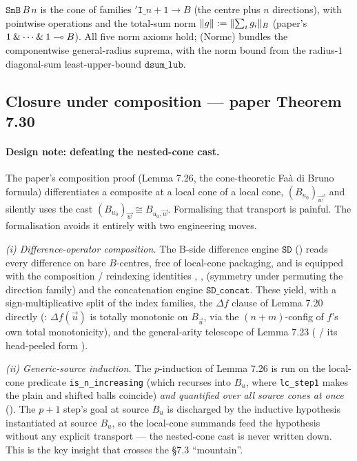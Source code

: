 \begin{lemma}\label{lem:snb}
\rocqok{}
$\texttt{SnB}\,B\,n$ is the cone of families $\mathtt{'I}\_{n+1} \to B$
(the centre plus $n$ directions), with pointwise operations and the
total-sum norm $\lVert g \rVert := \lVert \sum_i g_i \rVert_B$ (paper's $1 \mathbin{\&}
\cdots \mathbin{\&} 1 \multimap B$). All five norm axioms hold; (Normc)
bundles the componentwise general-radius suprema, with the norm bound
from the radius-$1$ diagonal-sum least-upper-bound $\texttt{dsum\_lub}$.
\end{lemma}

\subsection{Closure under composition --- paper Theorem 7.30}

\paragraph{Design note: defeating the nested-cone cast.}
The paper's composition proof (Lemma 7.26, the cone-theoretic Fa\`a di
Bruno formula) differentiates a composite at a local cone of a local
cone, $(B_{u_0})_{\vec w}$, and silently uses the cast
$(B_{u_0})_{\vec w} \cong B_{u_0, \vec w}$. Formalising that transport
is painful. The formalisation avoids it entirely with two engineering
moves.

\emph{(i) Difference-operator composition.} The B-side difference engine
$\texttt{SD}$ () reads every difference
on bare $B$-centres, free of local-cone packaging, and is equipped with
the composition / reindexing identities
,
,
 (symmetry under permuting the
direction family) and the concatenation engine $\texttt{SD\_concat}$.
These yield, with a sign-multiplicative split of the index families,
the $\Delta f$ clause of Lemma 7.20 directly
(: $\Delta f(\vec u)$ is
totally monotonic on $B_{\vec u}$, via the $(n+m)$-config of $f$'s own
total monotonicity), and the general-arity telescope of Lemma 7.23
( / its head-peeled form
).

\emph{(ii) Generic-source induction.} The $p$-induction of Lemma 7.26 is
run on the local-cone predicate \texttt{is\_n\_increasing} (which
recurses into $B_u$, where \texttt{lc\_step1} makes the plain and shifted
balls coincide) \emph{and quantified over all source cones at once}
(). The $p+1$ step's goal at source
$B_u$ is discharged by the inductive hypothesis instantiated at source
$B_u$, so the local-cone summands feed the hypothesis without any
explicit transport --- the nested-cone cast is never written down. This
is the key insight that crosses the \S7.3 ``mountain''.

